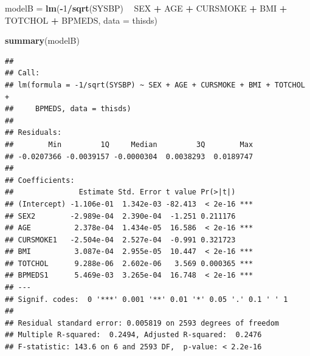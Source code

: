 \documentclass[10pt,ignorenonframetext,]{beamer}
\newenvironment{Shaded}{\begin{snugshade}}{\end{snugshade}}
\newcommand{\KeywordTok}[1]{\textcolor[rgb]{0.13,0.29,0.53}{\textbf{#1}}}
\newcommand{\DataTypeTok}[1]{\textcolor[rgb]{0.13,0.29,0.53}{#1}}
\newcommand{\DecValTok}[1]{\textcolor[rgb]{0.00,0.00,0.81}{#1}}
\newcommand{\StringTok}[1]{\textcolor[rgb]{0.31,0.60,0.02}{#1}}
\newcommand{\OperatorTok}[1]{\textcolor[rgb]{0.81,0.36,0.00}{\textbf{#1}}}
\newcommand{\NormalTok}[1]{#1}
\begin{document}
\begin{frame}[fragile]

\scriptsize

\begin{Shaded}
\begin{Highlighting}[]
\NormalTok{modelB =}\StringTok{ }\KeywordTok{lm}\NormalTok{(}\OperatorTok{-}\DecValTok{1}\OperatorTok{/}\KeywordTok{sqrt}\NormalTok{(SYSBP) }\OperatorTok{~}\StringTok{ }\NormalTok{SEX }\OperatorTok{+}\StringTok{ }\NormalTok{AGE }\OperatorTok{+}\StringTok{ }\NormalTok{CURSMOKE }\OperatorTok{+}\StringTok{ }\NormalTok{BMI }\OperatorTok{+}\StringTok{ }\NormalTok{TOTCHOL }\OperatorTok{+}\StringTok{ }\NormalTok{BPMEDS, }
    \DataTypeTok{data =}\NormalTok{ thisds)}

\KeywordTok{summary}\NormalTok{(modelB)}
\end{Highlighting}
\end{Shaded}

\begin{verbatim}
## 
## Call:
## lm(formula = -1/sqrt(SYSBP) ~ SEX + AGE + CURSMOKE + BMI + TOTCHOL + 
##     BPMEDS, data = thisds)
## 
## Residuals:
##        Min         1Q     Median         3Q        Max 
## -0.0207366 -0.0039157 -0.0000304  0.0038293  0.0189747 
## 
## Coefficients:
##               Estimate Std. Error t value Pr(>|t|)    
## (Intercept) -1.106e-01  1.342e-03 -82.413  < 2e-16 ***
## SEX2        -2.989e-04  2.390e-04  -1.251 0.211176    
## AGE          2.378e-04  1.434e-05  16.586  < 2e-16 ***
## CURSMOKE1   -2.504e-04  2.527e-04  -0.991 0.321723    
## BMI          3.087e-04  2.955e-05  10.447  < 2e-16 ***
## TOTCHOL      9.288e-06  2.602e-06   3.569 0.000365 ***
## BPMEDS1      5.469e-03  3.265e-04  16.748  < 2e-16 ***
## ---
## Signif. codes:  0 '***' 0.001 '**' 0.01 '*' 0.05 '.' 0.1 ' ' 1
## 
## Residual standard error: 0.005819 on 2593 degrees of freedom
## Multiple R-squared:  0.2494, Adjusted R-squared:  0.2476 
## F-statistic: 143.6 on 6 and 2593 DF,  p-value: < 2.2e-16
\end{verbatim}

\normalsize

\end{frame}
\end{document}
